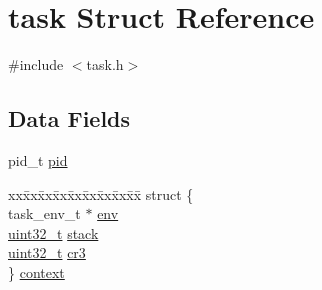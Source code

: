 \hypertarget{structtask}{\section{task Struct Reference}
\label{structtask}
}


{\ttfamily \#include $<$task.\+h$>$}

\subsection*{Data Fields}
\begin{DoxyCompactItemize}
\item 
pid\+\_\+t \hyperlink{structtask_ab56448ae42a75825ea923bd86648f3ae}{pid}
\item 
\begin{tabbing}
xx\=xx\=xx\=xx\=xx\=xx\=xx\=xx\=xx\=\kill
struct \{\\
\>task\_env\_t $\ast$ \hyperlink{structtask_a8dbbb79f7c29771d36f1d98ec84cbbdf}{env}\\
\>\hyperlink{aplus_8h_a53a0df51603c77c2aa5b9ea61b606a82}{uint32\_t} \hyperlink{structtask_a71232ebd31259f41c057b3e789b44587}{stack}\\
\>\hyperlink{aplus_8h_a53a0df51603c77c2aa5b9ea61b606a82}{uint32\_t} \hyperlink{structtask_a5f4968459d4640f19c7e802ae7057179}{cr3}\\
\} \hyperlink{structtask_a7e47fc3627188eeefc77f78e8d36ddd1}{context}\\


\end{tabbing}
\end{DoxyCompactItemize}
